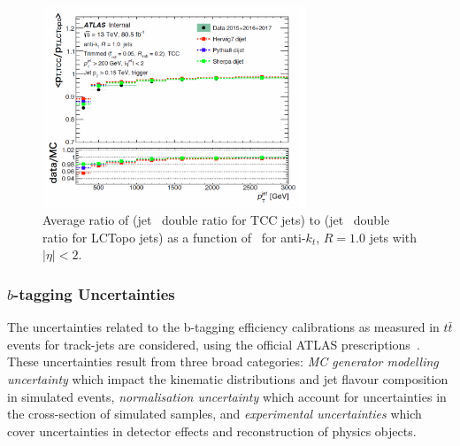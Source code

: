 \begin{figure}[htbp!]
\begin{center}
\includegraphics[width=0.7\textwidth]{tcc_track_calo_correlation.png}
\end{center}
\caption{Average ratio of (jet \pt\ double ratio for TCC jets) to (jet \pt\ double ratio for LCTopo jets) as a function of \pt\ for anti-$k_t$, $R=1.0$ jets with $|\eta| < 2$.
}
\label{fig:tcc_lctopo_calib}
\end{figure}

\subsubsection{$b$-tagging Uncertainties}
The uncertainties related to the b-tagging efficiency calibrations as measured in $t\bar{t}$ events for track-jets are considered, using the official ATLAS prescriptions~\cite{Aad:2019aic, Aaboud:2018xwy}.
These uncertainties result from three broad categories: \textit{MC generator modelling uncertainty} which impact the kinematic distributions and jet flavour composition in simulated events, \textit{normalisation uncertainty} which account for uncertainties in the cross-section of simulated samples, and \textit{experimental uncertainties} which cover uncertainties in detector effects and reconstruction of physics objects.

